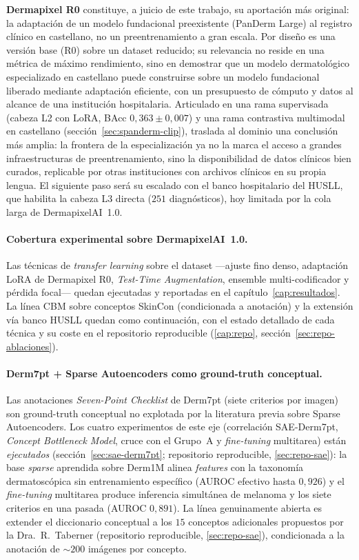 \textbf{Dermapixel R0} constituye, a juicio de este trabajo, su
aportación más original: la adaptación de un modelo fundacional
preexistente (PanDerm Large) al registro clínico en castellano, no un
preentrenamiento a gran escala. Por diseño es una versión base (R0)
sobre un dataset reducido; su relevancia no reside en una métrica de
máximo rendimiento, sino en demostrar que un modelo dermatológico
especializado en castellano puede construirse sobre un modelo
fundacional liberado mediante adaptación eficiente, con un presupuesto
de cómputo y datos al alcance de una institución hospitalaria.
Articulado en una rama supervisada (cabeza L2 con LoRA, BAcc
$0{,}363 \pm 0{,}007$) y una rama contrastiva multimodal en castellano
(sección~\ref{sec:spanderm-clip}), traslada al dominio una conclusión
más amplia: la frontera de la especialización ya no la marca el acceso a
grandes infraestructuras de preentrenamiento, sino la disponibilidad de
datos clínicos bien curados, replicable por otras instituciones con
archivos clínicos en su propia lengua. El siguiente paso será su escalado
con el banco hospitalario del HUSLL, que habilita la cabeza L3 directa
($251$ diagnósticos), hoy limitada por la cola larga de DermapixelAI~1.0.

\paragraph{Cobertura experimental sobre DermapixelAI~1.0.}
\label{sec:dermapixel-futuro}
Las técnicas de \emph{transfer learning} sobre el dataset ---ajuste fino
denso, adaptación LoRA de Dermapixel R0, \emph{Test-Time Augmentation},
ensemble multi-codificador y pérdida focal--- quedan ejecutadas y
reportadas en el capítulo~\ref{cap:resultados}. La línea CBM sobre
conceptos SkinCon (condicionada a anotación) y la extensión vía banco
HUSLL quedan como continuación, con el estado detallado de cada técnica
y su coste en el repositorio reproducible (\ref{cap:repo},
sección~\ref{sec:repo-ablaciones}).

\paragraph{Derm7pt + Sparse Autoencoders como ground-truth conceptual.}
\label{sec:linea-derm7pt-sae}
Las anotaciones \emph{Seven-Point Checklist} de Derm7pt (siete criterios
por imagen) son ground-truth conceptual no explotada por la literatura
previa sobre Sparse Autoencoders. Los cuatro experimentos de este eje
(correlación SAE-Derm7pt, \emph{Concept Bottleneck Model}, cruce con el
Grupo~A y \emph{fine-tuning} multitarea) están \emph{ejecutados}
(sección~\ref{sec:sae-derm7pt}; repositorio reproducible, \ref{sec:repo-sae}): la base
\emph{sparse} aprendida sobre Derm1M alinea \emph{features} con la
taxonomía dermatoscópica sin entrenamiento específico (AUROC efectivo
hasta $0{,}926$) y el \emph{fine-tuning} multitarea produce inferencia
simultánea de melanoma y los siete criterios en una pasada (AUROC
$0{,}891$). La línea genuinamente abierta es extender el diccionario
conceptual a los $15$ conceptos adicionales propuestos por la
Dra.~R.~Taberner (repositorio reproducible, \ref{sec:repo-sae}), condicionada a la anotación de
$\sim 200$ imágenes por concepto.

